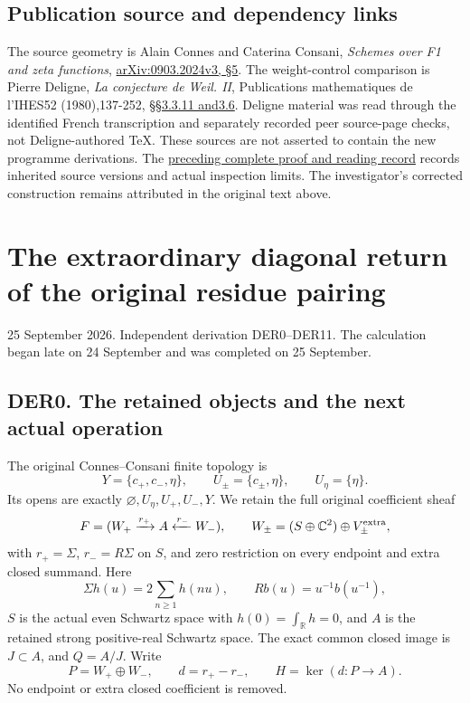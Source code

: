 \section{Publication source and dependency
links}\label{publication-source-and-dependency-links-3}

The source geometry is Alain Connes and Caterina Consani, \emph{Schemes
over F1 and zeta functions},
\href{https://arxiv.org/abs/0903.2024v3}{arXiv:0903.2024v3, §5}. The
weight-control comparison is Pierre Deligne, \emph{La conjecture de
Weil. II}, Publications mathematiques de l'IHES52 (1980),137-252,
\href{https://www.numdam.org/item/PMIHES_1980__52__137_0/}{§§3.3.11
and3.6}. Deligne material was read through the identified French
transcription and separately recorded peer source-page checks, not
Deligne-authored TeX. These sources are not asserted to contain the new
programme derivations. The
\href{https://github.com/KokunoYumeto/zeta-function-research-reader/blob/36a82ecca98addb8a98b48204e349737856c7223/workbenches/splitzero-tandem/continuations/20260924-cohomology-weight-and-character-lifts/BUILD_AND_REVIEW.md}{preceding
complete proof and reading record} records inherited source versions and
actual inspection limits. The investigator's corrected construction
remains attributed in the original text above.

\chapter{The extraordinary diagonal return of the original residue
pairing}\label{the-extraordinary-diagonal-return-of-the-original-residue-pairing}

25 September 2026. Independent derivation DER0--DER11. The calculation
began late on 24 September and was completed on 25 September.

\section{DER0. The retained objects and the next actual
operation}\label{der0.-the-retained-objects-and-the-next-actual-operation}

The original Connes--Consani finite topology is \[
Y=\{c_+,c_-,\eta\},\qquad U_\pm=\{c_\pm,\eta\},\qquad U_\eta=\{\eta\}.
\] Its opens are exactly \(\varnothing,U_\eta,U_+,U_-,Y\). We retain the
full original coefficient sheaf \[
F=(W_+\xrightarrow{r_+}A\xleftarrow{r_-}W_-),\qquad
W_\pm=(S\oplus\mathbb C^2)\oplus V_\pm^{\rm extra},
\] with \(r_+=\Sigma\), \(r_-=R\Sigma\) on \(S\), and zero restriction
on every endpoint and extra closed summand. Here \[
\Sigma h(u)=2\sum_{n\geq1}h(nu),\qquad Rb(u)=u^{-1}b(u^{-1}),
\] \(S\) is the actual even Schwartz space with
\(h(0)=\int_{\mathbb R}h=0\), and \(A\) is the retained strong
positive-real Schwartz space. The exact common closed image is
\(J\subset A\), and \(Q=A/J\). Write \[
P=W_+\oplus W_-,\qquad d=r_+-r_-,\qquad
H=\ker(d:P\to A).
\] No endpoint or extra closed coefficient is removed.

